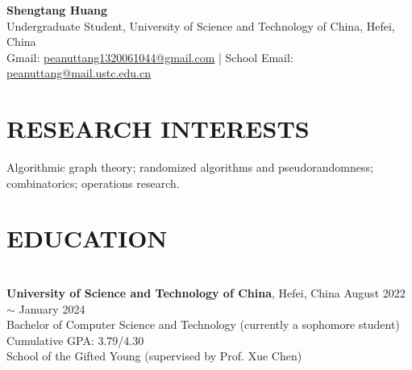 \documentclass[a4paper,9pt]{extarticle}
\begin{document}
\pagestyle{fancy}
\renewcommand{\headrulewidth}{0pt}
\fancyhead{}
\fancyhead[R]{\textit{\today}}
\thispagestyle{empty} %

\begin{flushleft}
\textbf{\LARGE Shengtang Huang}\\[2pt] %
Undergraduate Student, University of Science and Technology of China, Hefei, China
\\ Gmail: \href{mailto:peanuttang1320061044@gmail.com}{peanuttang1320061044@gmail.com} | School Email: \href{mailto:peanuttang@mail.ustc.edu.cn}{peanuttang@mail.ustc.edu.cn} %
\end{flushleft}

\section*{RESEARCH INTERESTS}
\noindent
Algorithmic graph theory; randomized algorithms and pseudorandomness; combinatorics; operations research.
\section*{EDUCATION}

\noindent\\
\textbf{University of Science and Technology of China},  Hefei, China \hfill August 2022 $\sim$ January 2024\\ %
Bachelor of Computer Science and Technology (currently a sophomore student) \hfill Cumulative GPA: 3.79/4.30 \\
School of the Gifted Young (supervised by Prof. Xue Chen)

\end{document}
